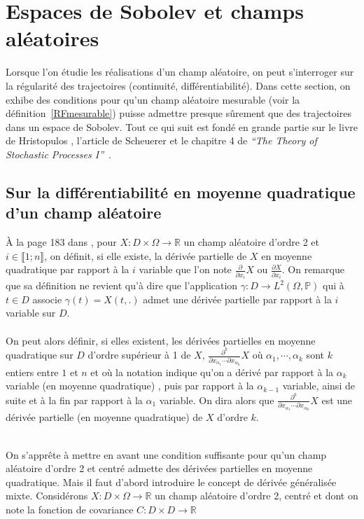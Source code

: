 \section{Espaces de Sobolev et champs aléatoires}

Lorsque l'on étudie les réalisations d'un champ aléatoire, on peut s'interroger
sur la régularité des trajectoires (continuité, différentiabilité). Dans cette
section, on exhibe des conditions pour qu'un champ aléatoire mesurable (voir
la définition~\ref{RFmesurable}) puisse admettre presque sûrement que des
trajectoires dans un espace de Sobolev. Tout ce qui suit est fondé en grande partie sur
le livre de Hristopulos \cite{alma991004158221006616}, l'article de Scheuerer \cite{ScheuererMichael2010Rots} et le chapitre 4 de \textit{``The Theory of Stochastic Processes I''}~\cite{GihmanSkoro}. 


\subsection{Sur la différentiabilité en moyenne quadratique d'un champ aléatoire}

\`A la page 183 dans \cite{alma991004158221006616}, pour $X: D \times \Omega \rightarrow \mathbb{R}$
un champ aléatoire d'ordre 2 et $i \in \llbracket 1;n \rrbracket$, on définit, si elle existe,
la dérivée partielle de $X$ en moyenne
quadratique par rapport à la $i$ variable que l'on note $\frac{\partial}{\partial x_i} X$ ou $\frac{\partial X}{\partial x_i}$. On remarque que sa définition ne
revient qu'à dire que l'application $\gamma: D \rightarrow L^2(\Omega,\mathbb{P})$
qui à $t \in D$ associe $\gamma(t) = X(t,.)$ admet une dérivée
partielle par rapport à la $i$ variable sur $D$.\\
~\\
On peut alors définir, si elles existent, les dérivées partielles en moyenne quadratique sur $D$ d'ordre supérieur à 1 de
$X$, $\frac{\partial^{k}}{\partial x_{\alpha_1} \cdots \partial x_{\alpha_k} } X$ où $\alpha_1, \cdots , \alpha_k$ sont $k$ entiers entre $1$ et $n$ et où la notation indique qu'on a dérivé par rapport à
la $\alpha_k$ variable (en moyenne quadratique) , puis par rapport à la $\alpha_{k-1}$ variable, ainsi de suite et à la fin par rapport à la $\alpha_{1}$ variable. On dira alors que $\frac{\partial^{k}}{\partial x_{\alpha_1} \cdots \partial x_{\alpha_k} } X$  est une dérivée partielle (en moyenne quadratique) de $X$ d'ordre $k$.

~\\On s'apprête à mettre en avant une condition suffisante pour qu'un champ aléatoire d'ordre 2 et centré admette des dérivées partielles en moyenne quadratique. Mais il
faut d'abord introduire le concept de dérivée généralisée mixte. Considérons \mbox{$X: D \times \Omega \rightarrow \mathbb{R}$} un champ
aléatoire d'ordre 2, centré et dont on note la fonction de covariance
$C: D \times D \rightarrow \mathbb{R}$

